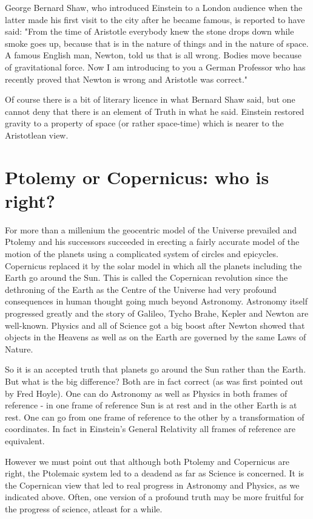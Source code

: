 George Bernard Shaw, who introduced Einstein to a London
audience when the latter made his first visit to the city
after he became famous, is reported to have said:
"From the time of Aristotle everybody knew the stone drops
down while smoke goes up, because that is in the nature of
things and in the nature of space. A famous English man,
Newton, told us that is all wrong. Bodies move because of 
gravitational force. Now I am introducing to you a German
Professor who has recently proved that Newton is wrong and
Aristotle was correct." 

Of course there is a bit of literary licence in what Bernard 
Shaw said, but one cannot deny that there is an element of
Truth in what he said. Einstein restored gravity to a property
of space (or rather space-time) which is nearer to the
Aristotlean view.

\section{Ptolemy or Copernicus: who is right?}


For more than a millenium the geocentric model of the
Universe prevailed and Ptolemy and his successors succeeded
in erecting a fairly accurate model of the motion of
the planets using a complicated system of circles and epicycles.
Copernicus replaced it by the solar model in which all the
planets including the Earth go around the Sun. This is called
the Copernican revolution since the dethroning of the Earth
as the Centre of the Universe had very profound consequences
in human thought going much beyond Astronomy. Astronomy itself
progressed greatly and the story of Galileo, Tycho Brahe, Kepler
and Newton are well-known. Physics and all of Science got a big
boost after Newton showed that objects in the Heavens as well
as on the Earth are governed by the same Laws of Nature.

So it is an accepted truth that planets go around the Sun rather
than the Earth. But what is the big difference? Both are in fact
correct (as was first pointed out by Fred Hoyle). One can do 
Astronomy as well as Physics in both frames
of reference - in one frame of reference Sun is at rest and in
the other Earth is at rest. One can go from one frame of reference
to the other by a transformation of coordinates. 
In fact in Einstein's General Relativity all frames of reference 
are equivalent.

However we must point out that although both Ptolemy and
Copernicus are right, the Ptolemaic system led to a deadend
as far as Science is concerned. It is the Copernican view that
led to real progress in Astronomy and Physics, as we indicated
above. Often, one version of a profound truth may be more
fruitful for the progress of science, atleast for a while.

